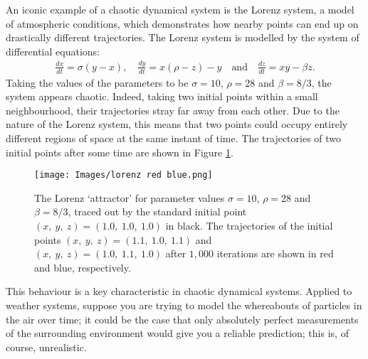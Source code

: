 \begin{exmp}
    An iconic example of a chaotic dynamical system is the Lorenz system, a model of atmospheric conditions\cite{lorenz1963deterministic}, which demonstrates how nearby points can end up on drastically different trajectories. The Lorenz system is modelled by the system of differential equations:
    \begin{align}
        \frac{dx}{dt} = \sigma (y-x), \quad \frac{dy}{dt} = x(\rho -z)-y \quad\text{and} \quad \frac{dz}{dt} = xy-\beta z.
    \end{align}\label{lorenzequation}
Taking the values of the parameters to be $\sigma=10$, $\rho=28$ and $\beta=8/3$, the system appears chaotic. Indeed, taking two initial points within a small neighbourhood, their trajectories stray far away from each other. Due to the nature of the Lorenz system, this means that two points could occupy entirely different regions of space at the same instant of time. The trajectories of two initial points after some time are shown in Figure \ref{fig:lorenzrb}.
\begin{figure}
    \centering
    \texttt{[image: Images/lorenz red blue.png]}
    \caption{The Lorenz `attractor' for parameter values $\sigma=10$, $\rho=28$ and $\beta=8/3$, traced out by the standard initial point $(x,\ y,\ z)=(1.0,\ 1.0,\ 1.0)$ in black. The trajectories of the initial points $(x,\ y,\ z)=(1.1,\ 1.0,\ 1.1)$ and $(x,\ y,\ z)=(1.0,\ 1.1,\ 1.0)$ after $1,000$ iterations are shown in red and blue, respectively.}
    \label{fig:lorenzrb}
\end{figure}
This behaviour is a key characteristic in chaotic dynamical systems. Applied to weather systems, suppose you are trying to model the whereabouts of particles in the air over time; it could be the case that only absolutely perfect measurements of the surrounding environment would give you a reliable prediction; this is, of course, unrealistic.
\end{exmp}
